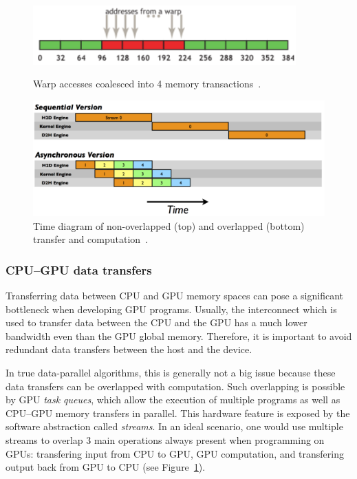 \begin{figure}[b]
	\centering
	\begin{minipage}{.5\textwidth}
        \centering
        \includegraphics[width=0.9\textwidth]{img/coal1}
        \caption{Warp accesses coalesced into 4 memory transactions~\cite{site:cuda}.}
        \label{fig:coal}
	\end{minipage}%
	\begin{minipage}{.5\textwidth}
        \centering
        \includegraphics[width=\textwidth]{img/C2050Timeline-1024x670.png}
        \caption{Time diagram of non-overlapped (top) and overlapped (bottom) transfer and computation~\cite{site:stream}.}
        \label{fig:transfer}
	\end{minipage}
\end{figure}

\subsubsection{CPU--GPU data transfers}
\label{sec:transfers}

Transferring data between CPU and GPU memory spaces can pose a significant bottleneck when developing GPU programs. Usually, the interconnect which is used to transfer data between the CPU and the GPU has a much lower bandwidth even than the GPU global memory. Therefore, it is important to avoid redundant data transfers between the host and the device. 

In true data-parallel algorithms, this is generally not a big issue because these data transfers can be overlapped with computation. Such overlapping is possible by GPU \emph{task queues}, which allow the execution of multiple programs as well as CPU--GPU memory transfers in parallel. This hardware feature is exposed by the software abstraction called \emph{streams}. In an ideal scenario, one would use multiple streams to overlap $3$ main operations always present when programming on GPUs: transfering input from CPU to GPU, GPU computation, and transfering output back from GPU to CPU (see Figure~\ref{fig:transfer}).

